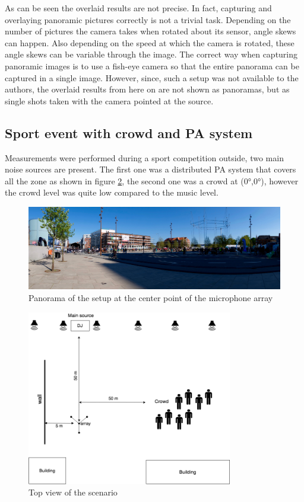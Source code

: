 As can be seen the overlaid results are not precise. In fact, capturing and overlaying panoramic pictures correctly is not a trivial task. Depending on the number of pictures the camera takes when rotated about its sensor, angle skews can happen. Also depending on the speed at which the camera is rotated, these angle skews can be variable through the image. The correct way when capturing panoramic images is to use a fish-eye camera so that the entire panorama can be captured in a single image. However, since, such a setup was not available to the authors, the overlaid results from here on are not shown as panoramas, but as single shots taken with the camera pointed at the source.
\subsection{Sport event with crowd and PA system }
Measurements were performed during a sport competition outside, two main noise sources are present. The first one was a distributed PA system that covers all the zone as shown in figure \ref{fig:Scenario1diagram}, the second one was a crowd at (0°,0°), however the crowd level was quite low compared to the music level.
\begin{figure}[H]
    \centering
    \includegraphics[width=1\textwidth]{Figures/bmxracepic.jpg}
    \caption{Panorama of the setup at the center point of the microphone array}
    \label{fig:Scenario3}
\end{figure}
\begin{figure}[H]
    \centering
    \includegraphics[width=0.8\textwidth]{Figures/bmxrace1.png}
    \caption{Top view of the scenario}
    \label{fig:Scenario1diagram}
\end{figure}
